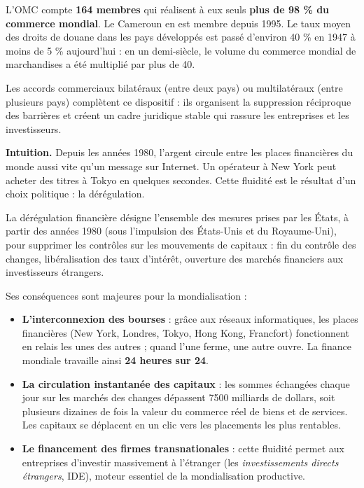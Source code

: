 \documentclass[11pt]{article}
\newcommand{\cle}[1]{{\popxbold\color{popdark}#1}}
\newcounter{popsec}
\newcounter{popsub}
\newcommand{\courssub}[1]{%
  \stepcounter{popsub}%
  \par\vspace{9pt}\noindent{\popxbold\fontsize{11.5}{13}\selectfont\color{popink}{\color{poporange}\thepopsec.\thepopsub}\hspace{6pt}#1}\par\nopagebreak\vspace{4pt}
}
\begin{document}
\begin{exemplebox}
L'OMC compte \textbf{164 membres} qui réalisent à eux seuls \textbf{plus de 98 \% du commerce mondial}. Le Cameroun en est membre depuis 1995. Le taux moyen des droits de douane dans les pays développés est passé d'environ 40 \% en 1947 à moins de 5 \% aujourd'hui : en un demi-siècle, le volume du commerce mondial de marchandises a été multiplié par plus de 40.
\end{exemplebox}

Les \cle{accords commerciaux} bilatéraux (entre deux pays) ou multilatéraux (entre plusieurs pays) complètent ce dispositif : ils organisent la suppression réciproque des barrières et créent un cadre juridique stable qui rassure les entreprises et les investisseurs.

\courssub{La dérégulation financière}

\textbf{Intuition.} Depuis les années 1980, l'argent circule entre les places financières du monde aussi vite qu'un message sur Internet. Un opérateur à New York peut acheter des titres à Tokyo en quelques secondes. Cette fluidité est le résultat d'un choix politique : la \cle{dérégulation}.

\begin{definition}
La \cle{dérégulation financière} désigne l'ensemble des mesures prises par les États, à partir des années 1980 (sous l'impulsion des États-Unis et du Royaume-Uni), pour supprimer les contrôles sur les mouvements de capitaux : fin du contrôle des changes, libéralisation des taux d'intérêt, ouverture des marchés financiers aux investisseurs étrangers.
\end{definition}

Ses conséquences sont majeures pour la mondialisation :

\begin{itemize}
\item \textbf{L'interconnexion des bourses} : grâce aux réseaux informatiques, les places financières (New York, Londres, Tokyo, Hong Kong, Francfort) fonctionnent en relais les unes des autres ; quand l'une ferme, une autre ouvre. La finance mondiale travaille ainsi \textbf{24 heures sur 24}.
\item \textbf{La circulation instantanée des capitaux} : les sommes échangées chaque jour sur les marchés des changes dépassent \num{7500} milliards de dollars, soit plusieurs dizaines de fois la valeur du commerce réel de biens et de services. Les capitaux se déplacent en un clic vers les placements les plus rentables.
\item \textbf{Le financement des firmes transnationales} : cette fluidité permet aux entreprises d'investir massivement à l'étranger (les \emph{investissements directs étrangers}, IDE), moteur essentiel de la mondialisation productive.
\end{itemize}
\end{document}
